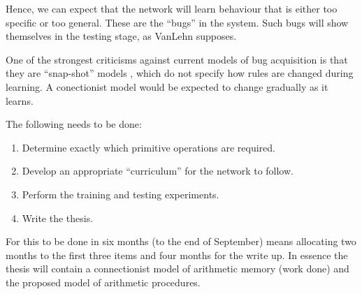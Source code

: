 Hence, we can expect that the network will learn behaviour that is either
too specific or too general.  These are the ``bugs'' in the system.  Such
bugs will show themselves in the testing stage, as VanLehn supposes.

One of the strongest criticisms against current models of bug acquisition
is that they are ``snap-shot'' models \cite{hennwhy}, which do not specify
how rules are changed during learning.  A conectionist model would be
expected to change gradually as it learns.


The following needs to be done:

\begin{enumerate}
\item Determine exactly which primitive operations are required.
\item Develop an appropriate ``curriculum'' for the network to follow.
\item Perform the training and testing experiments.
\item Write the thesis.
\end{enumerate}

For this to be done in six months (to the end of September) means
allocating two months to the first three items and four months for the
write up.  In essence the thesis will contain a connectionist model of
arithmetic memory (work done) and the proposed model of arithmetic
procedures.




